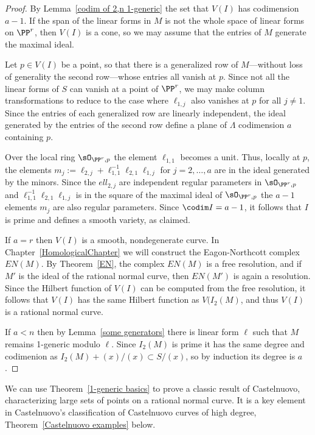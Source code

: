 \begin{proof}  By Lemma~\ref{codim of 2,n 1-generic} the set that $V(I)$ has codimension $a-1$.
If the span of the linear forms in $M$ is not the whole space of linear forms on $\PP^r$, then $V(I)$ is a cone,
so we may assume that the entries of $M$ generate the maximal ideal.

 Let $p\in V(I)$ be a point, so that there is a generalized row of $M$---without loss of generality the second row---whose 
 entries all vanish
at $p$. Since not all the linear forms
of $S$ can vanish at a point of $\PP^r$, we may make column transformations to reduce to the case where
$\ell_{1,j}$ also vanishes at $p$ for all $j\neq 1$. Since the entries
of each generalized row are linearly independent, the ideal generated by the entries of the second row define a plane of
$\Lambda$ codimension $a$ containing $p$. 

Over the local ring $\sO_{\PP^r, p}$ the element $\ell_{1,1}$ becomes a unit.
Thus, locally at $p$, the elements $m_{j}:= \ell_{2,j}+ \ell_{1,1}^{-1}\ell_{2,1}\ell_{1,j}$ for $j=2,\dots, a$ are in the ideal generated
by the minors. Since the $ell_{2,j}$ are independent regular parameters in $\sO_{\PP^r, p}$ and 
$\ell_{1,1}^{-1}\ell_{2,1}\ell_{1,j}$ is in the square of the maximal ideal of $\sO_{\PP^r, p}$ the
$a-1$ elements $m_{j}$
are also regular parameters. Since $\codim I = a-1$, it follows that $I$ is prime and defines a smooth variety, as claimed.

If $a=r$ then $V(I)$ is a smooth, nondegenerate curve. In Chapter~\ref{HomologicalChapter} we will construct the Eagon-Northcott complex $EN(M)$. By Theorem~\ref{EN}, the complex $EN(M)$ is a free resolution,
and if $M'$ is the ideal of the rational normal curve, then $EN(M')$ is again a resolution. Since the Hilbert
function of $V(I)$ can be computed from the free resolution, it follows that $V(I)$ has the same Hilbert function
as $V(I_2(M)$, and thus $V(I)$ is a rational normal curve.

If $a<n$ then by Lemma~\ref{some generators} there is linear form $\ell$ such that $M$ remains 1-generic modulo $\ell$.
Since $I_2(M)$ is prime it has the same degree and codimenion as $I_2(M) +(x)/(x) \subset S/(x)$, so by induction its degree
is $a$.
\end{proof}

We can use Theorem~\ref{1-generic basics} to prove a classic result of Castelnuovo, characterizing large sets of 
points on a rational normal curve. It is a key element in Castelnuovo's classification of Castelnuovo curves of high
degree, Theorem~\ref{Castelnuovo examples} below.

